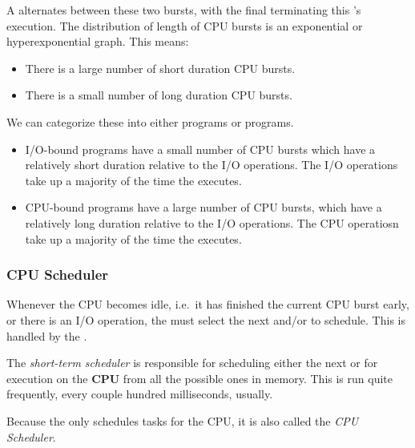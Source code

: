 A  alternates between these two bursts, with the final  terminating this 's execution.
The distribution of length of CPU bursts is an exponential or hyperexponential graph.
This means:
\begin{itemize}[noitemsep]
\item There is a large number of short duration CPU bursts.
\item There is a small number of long duration CPU bursts.
\end{itemize}

We can categorize these into either  programs or  programs.
\begin{itemize}[noitemsep]
\item I/O-bound programs have a small number of CPU bursts which have a relatively short duration relative to the I/O operations.
  The I/O operations take up a majority of the time the  executes.
\item CPU-bound programs have a large number of CPU bursts, which have a relatively long duration relative to the I/O operations.
  The CPU operatiosn take up a majority of the time the  executes.
\end{itemize}

\subsubsection{CPU Scheduler}\label{subsubsec:CPU_Scheduler}
Whenever the CPU becomes idle, i.e.\ it has finished the current CPU burst early, or there is an I/O operation, the  must select the next  and/or  to schedule.
This is handled by the .

\begin{definition}\label{def:Short_Term_Scheduler}
  The \emph{short-term scheduler} is responsible for scheduling either the next  or  for execution on the \textbf{CPU} from all the possible ones in memory.
  This is run quite frequently, every couple hundred milliseconds, usually.

  \begin{remark}\label{rmk:CPU_Scheduler}
    Because the  only schedules tasks for the CPU, it is also called the \emph{CPU Scheduler}.
  \end{remark}
\end{definition}

